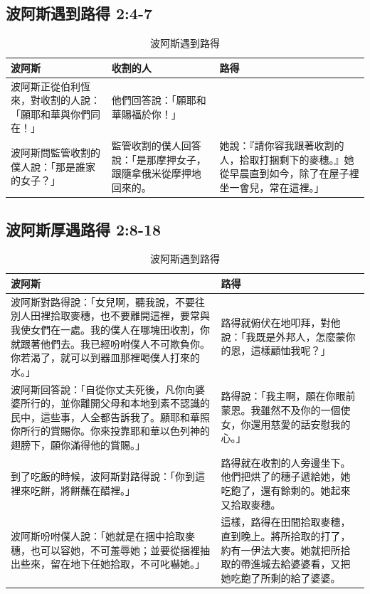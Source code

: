 \subsection{波阿斯遇到路得 2:4-7}
\begin{table}[H]
\centering
\begin{tabular}{p{}|p{5.5cm}|p{6.5cm}}\hline
波阿斯&收割的人&路得\\\hline
波阿斯正從伯利恆來，對收割的人說：「願耶和華與你們同在！」
&他們回答說：「願耶和華賜福於你！」 & \\\hline
波阿斯問監管收割的僕人說：「那是誰家的女子？」 &監管收割的僕人回答說：「是那摩押女子，跟隨拿俄米從摩押地回來的。&
她說：『請你容我跟著收割的人，拾取打捆剩下的麥穗。』她從早晨直到如今，除了在屋子裡坐一會兒，常在這裡。」\\\hline
\end{tabular}
\caption{波阿斯遇到路得}
\end{table} 


\subsection{波阿斯厚遇路得 2:8-18}
\begin{table}[H]
\centering
\begin{tabular}{p{}|p{}}\hline
波阿斯&路得\\\hline
波阿斯對路得說：「女兒啊，聽我說，不要往別人田裡拾取麥穗，也不要離開這裡，要常與我使女們在一處。我的僕人在哪塊田收割，你就跟著他們去。我已經吩咐僕人不可欺負你。你若渴了，就可以到器皿那裡喝僕人打來的水。」
&路得就俯伏在地叩拜，對他說：「我既是外邦人，怎麼蒙你的恩，這樣顧恤我呢？」 \\\hline
波阿斯回答說：「自從你丈夫死後，凡你向婆婆所行的，並你離開父母和本地到素不認識的民中，這些事，人全都告訴我了。願耶和華照你所行的賞賜你。你來投靠耶和華以色列神的翅膀下，願你滿得他的賞賜。」 &路得說：「我主啊，願在你眼前蒙恩。我雖然不及你的一個使女，你還用慈愛的話安慰我的心。」
\\\hline
到了吃飯的時候，波阿斯對路得說：「你到這裡來吃餅，將餅蘸在醋裡。」&
路得就在收割的人旁邊坐下。他們把烘了的穗子遞給她，她吃飽了，還有餘剩的。她起來又拾取麥穗。\\\hline
波阿斯吩咐僕人說：「她就是在捆中拾取麥穗，也可以容她，不可羞辱她；並要從捆裡抽出些來，留在地下任她拾取，不可叱嚇她。」&這樣，路得在田間拾取麥穗，直到晚上。將所拾取的打了，約有一伊法大麥。她就把所拾取的帶進城去給婆婆看，又把她吃飽了所剩的給了婆婆。\\\hline
\end{tabular}
\caption{波阿斯遇到路得}
\end{table} 

